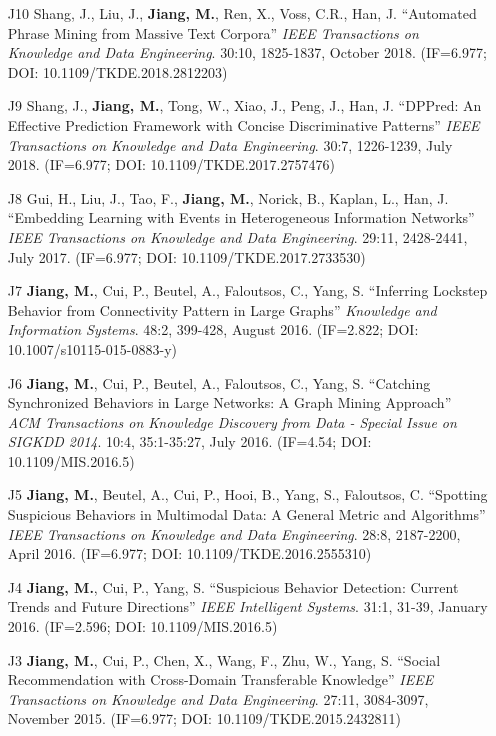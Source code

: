 \documentclass[10pt]{article}
\newenvironment{myindentpar}[1]%
{\begin{list}{}%
         {\setlength{\leftmargin}{#1}}%
         \item[]%
}
{\end{list}}
\newcounter{list}
\begin{document}
\begin{myindentpar}{0.00cm}
\begin{enumerate}[leftmargin=.5cm]
\item[J10] Shang, J., Liu, J., \textbf{Jiang, M.}, Ren, X., Voss, C.R., Han, J. ``Automated Phrase Mining from Massive Text Corpora'' \textit{IEEE Transactions on Knowledge and Data Engineering}. 30:10, 1825-1837, October 2018. (IF=6.977; DOI: 10.1109/TKDE.2018.2812203)

\item[J9] Shang, J., \textbf{Jiang, M.}, Tong, W., Xiao, J., Peng, J., Han, J. ``DPPred: An Effective Prediction Framework with Concise Discriminative Patterns'' \textit{IEEE Transactions on Knowledge and Data Engineering}. 30:7, 1226-1239, July 2018. (IF=6.977; DOI: 10.1109/TKDE.2017.2757476)

\item[J8] Gui, H., Liu, J., Tao, F., \textbf{Jiang, M.}, Norick, B., Kaplan, L., Han, J. ``Embedding Learning with Events in Heterogeneous Information Networks'' \textit{IEEE Transactions on Knowledge and Data Engineering}. 29:11, 2428-2441, July 2017. (IF=6.977; DOI: 10.1109/TKDE.2017.2733530)

\item[J7] \textbf{Jiang, M.}, Cui, P., Beutel, A., Faloutsos, C., Yang, S. ``Inferring Lockstep Behavior from Connectivity Pattern in Large Graphs'' \textit{Knowledge and Information Systems}. 48:2, 399-428, August 2016. (IF=2.822; DOI: 10.1007/s10115-015-0883-y)

\item[J6] \textbf{Jiang, M.}, Cui, P., Beutel, A., Faloutsos, C., Yang, S. ``Catching Synchronized Behaviors in Large Networks: A Graph Mining Approach'' \textit{ACM Transactions on Knowledge Discovery from Data - Special Issue on SIGKDD 2014}. 10:4, 35:1-35:27, July 2016. (IF=4.54; DOI: 10.1109/MIS.2016.5)

\item[J5] \textbf{Jiang, M.}, Beutel, A., Cui, P., Hooi, B., Yang, S., Faloutsos, C. ``Spotting Suspicious Behaviors in Multimodal Data: A General Metric and Algorithms'' \textit{IEEE Transactions on Knowledge and Data Engineering}. 28:8, 2187-2200, April 2016. (IF=6.977; DOI: 10.1109/TKDE.2016.2555310)

\item[J4] \textbf{Jiang, M.}, Cui, P., Yang, S. ``Suspicious Behavior Detection: Current Trends and Future Directions'' \textit{IEEE Intelligent Systems}. 31:1, 31-39, January 2016. (IF=2.596; DOI: 10.1109/MIS.2016.5)

\item[J3] \textbf{Jiang, M.}, Cui, P., Chen, X., Wang, F., Zhu, W., Yang, S. ``Social Recommendation with Cross-Domain Transferable Knowledge'' \textit{IEEE Transactions on Knowledge and Data Engineering}. 27:11, 3084-3097, November 2015. (IF=6.977; DOI: 10.1109/TKDE.2015.2432811)


\end{enumerate}
\end{myindentpar}
\end{document}
